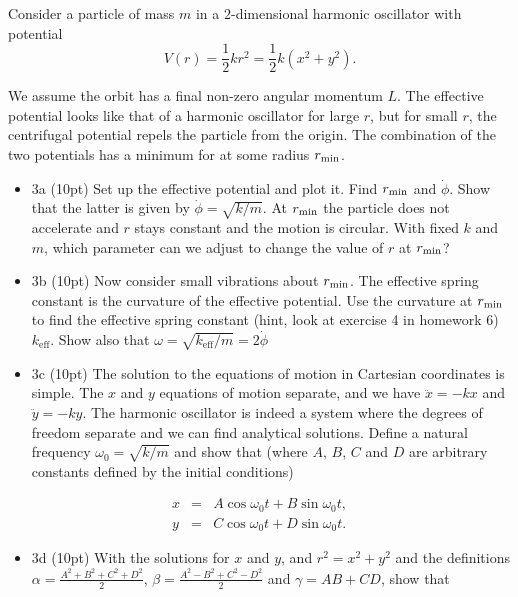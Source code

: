 \documentclass[%
oneside,                 %
final,                   %
10pt]{article}
\begin{document}
Consider a particle of mass $m$ in a $2$-dimensional harmonic oscillator with potential
\[
V(r)=\frac{1}{2}kr^2=\frac{1}{2}k(x^2+y^2).
\]

We assume the orbit has a final non-zero angular momentum $L$.  The
effective potential looks like that of a harmonic oscillator for large
$r$, but for small $r$, the centrifugal potential repels the particle
from the origin. The combination of the two potentials has a minimum
for at some radius $r_{\rm min}$.


\begin{itemize}
\item 3a (10pt) Set up the effective potential and plot it. Find $r_{\rm min}$ and $\dot{\phi}$. Show that the latter is given by $\dot{\phi}=\sqrt{k/m}$.  At $r_{\rm min}$ the particle does not accelerate and $r$ stays constant and the motion is circular. With fixed $k$ and $m$, which parameter can we adjust to change the value of $r$ at $r_{\rm min}$?

\item 3b (10pt) Now consider small vibrations about $r_{\rm min}$. The effective spring constant is the curvature of the effective potential.  Use the curvature at $r_{\rm min}$ to find the effective spring constant (hint, look at  exercise 4 in homework 6) $k_{\mathrm{eff}}$. Show also that $\omega=\sqrt{k_{\mathrm{eff}}/m}=2\dot{\phi}$  

\item 3c (10pt) The solution to the equations of motion in Cartesian coordinates is simple. The $x$ and $y$ equations of motion separate, and we have $\ddot{x}=-kx$ and $\ddot{y}=-ky$. The harmonic oscillator is indeed a system where the degrees of freedom separate and we can find analytical solutions. Define a natural frequency $\omega_0=\sqrt{k/m}$ and show that (where $A$, $B$, $C$ and $D$ are arbitrary constants defined by the initial conditions)
\end{itemize}

\noindent
\begin{eqnarray*}
x&=&A\cos\omega_0 t+B\sin\omega_0 t,\\
y&=&C\cos\omega_0 t+D\sin\omega_0 t.
\end{eqnarray*}

\begin{itemize}
\item 3d (10pt) With the solutions for $x$ and $y$, and $r^2=x^2+y^2$ and the definitions $\alpha=\frac{A^2+B^2+C^2+D^2}{2}$, $\beta=\frac{A^2-B^2+C^2-D^2}{2}$ and $\gamma=AB+CD$, show that
\end{itemize}
\end{document}
